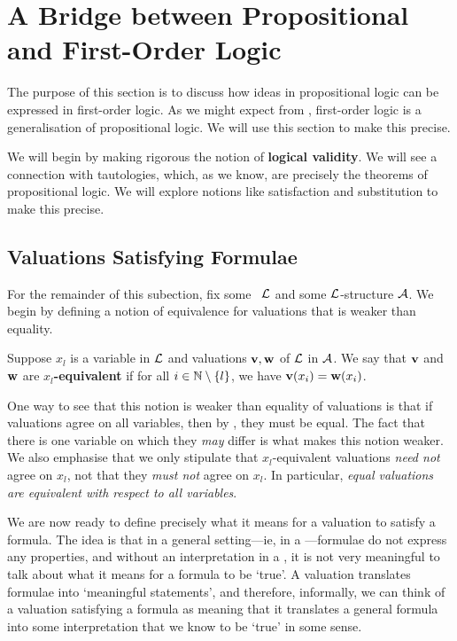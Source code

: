 \section{A Bridge between Propositional and First-Order Logic}\label{Ch2:Sec:Prop_Logic}

The purpose of this section is to discuss how ideas in propositional logic can be expressed in first-order logic. As we might expect from , first-order logic is a generalisation of propositional logic. We will use this section to make this precise.

We will begin by making rigorous the notion of \textbf{logical validity}. We will see a connection with tautologies, which, as we know, are precisely the theorems of propositional logic. We will explore notions like satisfaction and substitution to make this precise.

\subsection{Valuations Satisfying Formulae}

For the remainder of this subection, fix some \fola\ $\mathcal{L}$ and some $\mathcal{L}$-structure $\mathcal{A}$. We begin by defining a notion of equivalence for valuations that is weaker than equality.

\begin{boxdefinition}
    Suppose $x_l$ is a variable in $\mathcal{L}$ and valuations $\mathbf{v}, \mathbf{w}$ of $\mathcal{L}$ in $\mathcal{A}$. We say that $\mathbf{v}$ and $\mathbf{w}$ are \textbf{$x_l$-equivalent} if for all $i \in \mathbb{N} \setminus \left\{ l \right\}$, we have $\mathbf{v}\!\left( x_i \right) = \mathbf{w}\!\left( x_i \right)$.
\end{boxdefinition}

One way to see that this notion is weaker than equality of valuations is that if valuations agree on all variables, then by , they must be equal. The fact that there is one variable on which they \textit{may} differ is what makes this notion weaker. We also emphasise that we only stipulate that $x_l$-equivalent valuations \textit{need not} agree on $x_l$, not that they \textit{must not} agree on $x_l$. In particular, \textit{equal valuations are equivalent with respect to all variables}.

We are now ready to define precisely what it means for a valuation to satisfy a formula. The idea is that in a general setting---ie, in a \fola---formulae do not express any properties, and without an interpretation in a \fos, it is not very meaningful to talk about what it means for a formula to be `true'. A valuation translates formulae into `meaningful statements', and therefore, informally, we can think of a valuation satisfying a formula as meaning that it translates a general formula into some interpretation that we know to be `true' in some sense.

